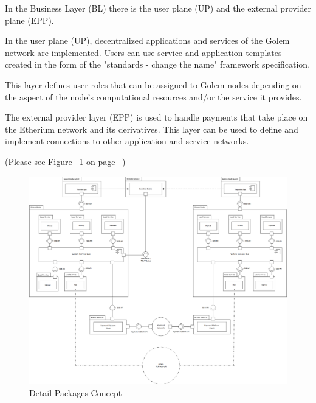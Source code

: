 In the Business Layer (BL) there is the user plane (UP) and the external provider plane (EPP).

In the user plane (UP), decentralized applications and services of the Golem network are implemented.
Users can use service and application templates created in the form of the "standards - change the name" framework specification.

This layer defines user roles that can be assigned to Golem nodes depending on the aspect of the node's computational resources and/or the service it provides.

The external provider layer (EPP) is used to handle payments that take place on the Etherium network and its derivatives.
This layer can be used to define and implement connections to other application and service networks.



(Please see Figure ~\ref{fig:DPC} on page ~\pageref{fig:DPC})

\begin{figure}[H]
    \centering
    \includegraphics[width=18cm,angle=0]{./diag/Abstract/DetailPackage-Abstract.png}
	\caption{Detail Packages Concept}
    \label{fig:DPC}
\end{figure}


